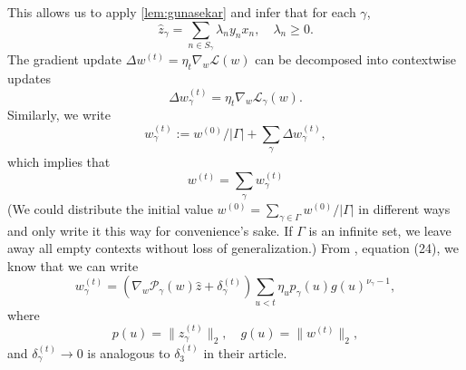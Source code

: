 \documentclass{article}
\theoremstyle{plain}
\theoremstyle{definition}
\theoremstyle{remark}
\begin{document}
This allows us to apply \cref{lem:gunasekar} and infer that for each $\gamma$,
\begin{equation}
    \hat{z}_{\gamma}=\sum_{n\in S_{\gamma}}\lambda_ny_nx_n,\quad\lambda_n\geq0.
\end{equation}
The gradient update $\Delta w^{(t)}=\eta_t\nabla_w\mathcal{L}(w)$ can be decomposed into contextwise updates
\begin{equation}
    \Delta w^{(t)}_{\gamma}=\eta_t\nabla_w\mathcal{L}_{\gamma}(w).
\end{equation}
Similarly, we write
\begin{equation}
    w^{(t)}_{\gamma}:=w^{(0)}/|\Gamma|+\sum_{\gamma}\Delta w^{(t)}_{\gamma},
\end{equation}
which implies that
\begin{equation}
    w^{(t)}=\sum_{\gamma}w^{(t)}_{\gamma}
\end{equation}
(We could distribute the initial value $w^{(0)}=\sum_{\gamma\in\Gamma}w^{(0)}/|\Gamma|$ in different ways and only write it this way for convenience's sake. If $\Gamma$ is an infinite set, we leave away all empty contexts without loss of generalization.)
From \citet{gunasekar_implicit_2018}, equation (24), we know that we can write
\begin{equation}
    w^{(t)}_{\gamma}=\left(\nabla_w\mathcal{P}_{\gamma}(w)\hat{z}+\delta_{\gamma}^{(t)}\right)\sum_{u<t}\eta_up_{\gamma}(u)g(u)^{\nu_{\gamma}-1},
\end{equation}
where
\begin{equation}
    p(u)=\|z_{\gamma}^{(t)}\|_2,\quad
    g(u)=\|w^{(t)}\|_2,
\end{equation}
and $\delta_{\gamma}^{(t)}\to0$ is analogous to $\delta_3^{(t)}$ in their article.
\end{document}
